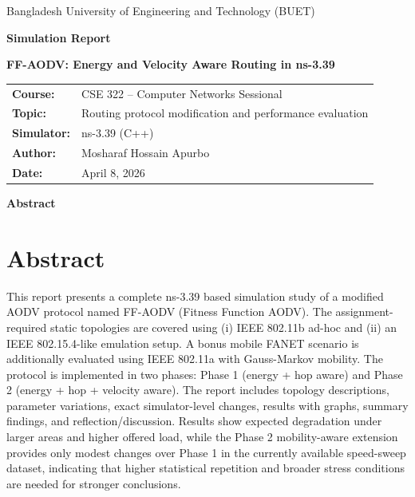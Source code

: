 \documentclass[12pt,a4paper]{article}
\begin{document}
\begin{titlepage}
\centering
{\Large Bangladesh University of Engineering and Technology (BUET) \par}
\vspace{1.5cm}
{\LARGE \textbf{Simulation Report}}\par
\vspace{0.4cm}
{\Large \textbf{FF-AODV: Energy and Velocity Aware Routing in ns-3.39}}\par
\vspace{1.2cm}

\begin{tabular}{ll}
\textbf{Course:} & CSE 322 -- Computer Networks Sessional \\
\textbf{Topic:} & Routing protocol modification and performance evaluation \\
\textbf{Simulator:} & ns-3.39 (C++) \\
\textbf{Author:} & Mosharaf Hossain Apurbo \\
\textbf{Date:} & April 8, 2026
\end{tabular}

\vfill
\textbf{Abstract}
\end{titlepage}

\section*{Abstract}
This report presents a complete ns-3.39 based simulation study of a modified AODV protocol named FF-AODV (Fitness Function AODV). The assignment-required static topologies are covered using (i) IEEE 802.11b ad-hoc and (ii) an IEEE 802.15.4-like emulation setup. A bonus mobile FANET scenario is additionally evaluated using IEEE 802.11a with Gauss-Markov mobility. The protocol is implemented in two phases: Phase 1 (energy + hop aware) and Phase 2 (energy + hop + velocity aware). The report includes topology descriptions, parameter variations, exact simulator-level changes, results with graphs, summary findings, and reflection/discussion. Results show expected degradation under larger areas and higher offered load, while the Phase 2 mobility-aware extension provides only modest changes over Phase 1 in the currently available speed-sweep dataset, indicating that higher statistical repetition and broader stress conditions are needed for stronger conclusions.

\tableofcontents
\newpage
\end{document}
